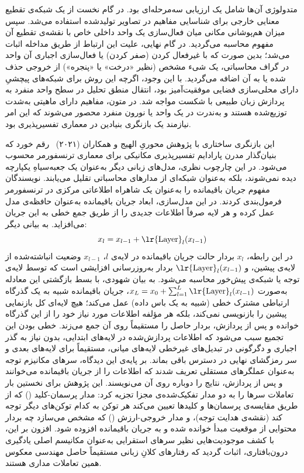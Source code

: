 متدولوژی آن‌ها شامل یک ارزیابی سه‌مرحله‌ای بود. در گام نخست از یک شبکه‌ی تقطیع معنایی خارجی برای شناسایی مفاهیم در تصاویر تولیدشده استفاده می‌شد. سپس میزان هم‌پوشانی مکانی میان فعال‌سازی یک واحد داخلی خاص با نقشه‌ی تقطیع آن مفهوم محاسبه می‌گردید. در گام نهایی، علیت این ارتباط از طریق مداخله اثبات می‌شد؛ بدین صورت که با غیرفعال کردن (صفر کردن) یا فعال‌سازی اجباری آن واحد در گراف محاسباتی، یک شیء مشخص (نظیر «درخت» یا «پنجره») از خروجی حذف شده یا به آن اضافه می‌گردید. با این وجود، اگرچه این روش برای شبکه‌های پیچشیِ دارای محلی‌سازی فضایی موفقیت‌آمیز بود، انتقال منطق تحلیل در سطح واحد منفرد به پردازش زبان طبیعی با شکست مواجه شد. در متون، مفاهیم دارای ماهیتی به‌شدت توزیع‌شده هستند و به‌ندرت در یک واحد یا نورون منفرد محصور می‌شوند که این امر نیازمند یک بازنگری بنیادین در معماری تفسیرپذیری بود.

این بازنگری ساختاری با پژوهش محوریِ الهیج و همکاران (۲۰۲۱)~\cite{elhage2021mathematical} رقم خورد که بنیان‌گذار مدرن پارادایم تفسیرپذیری مکانیکی برای معماری ترنسفورمر محسوب می‌شود. در این چارچوب نظری، مدل‌های زبانی دیگر به‌عنوان یک جعبه‌سیاهِ یکپارچه دیده نمی‌شوند، بلکه به‌عنوان شبکه‌ای از مدارهای محاسباتی تقلیل می‌یابند. نویسندگان مفهوم جریان باقیمانده را به‌عنوان یک شاهراه اطلاعاتی مرکزی در ترنسفورمر فرمول‌بندی کردند. در این مدل‌سازی، ابعاد جریان باقیمانده به‌عنوان حافظه‌ی مدل عمل کرده و هر لایه صرفاً اطلاعات جدیدی را از طریق جمع خطی به این جریان می‌افزاید. به بیانی دیگر:
\begin{equation}\label{eq:chap3_residual_stream}
    x_l = x_{l-1} + \text{\lr{Layer}}_l(x_{l-1})
\end{equation}
در این رابطه، $x_l$ بردار حالت جریان باقیمانده در لایه‌ی $l$، $x_{l-1}$ وضعیت انباشته‌شده از لایه‌ی پیشین، و $\text{\lr{Layer}}_l(x_{l-1})$ بردار به‌روزرسانی افزایشی است که توسط لایه‌ی توجه یا شبکه‌ی پیش‌خور محاسبه می‌شود. به بیان شهودی، با بسط بازگشتی این معادله به‌صورت $x_L = x_0 + \sum_{l=1}^L \text{\lr{Layer}}_l(x_{l-1})$، جریان باقیمانده شبیه به یک گذرگاه ارتباطی مشترک خطی (شبیه به یک باس داده) عمل می‌کند؛ هیچ لایه‌ای کل بازنمایی پیشین را بازنویسی نمی‌کند، بلکه هر مؤلفه اطلاعات مورد نیاز خود را از این گذرگاه خوانده و پس از پردازش، بردار حاصل را مستقیماً روی آن جمع می‌زند. خطی بودن این تجمیع سبب می‌شود که اطلاعات پردازش‌شده در لایه‌های ابتدایی، بدون نیاز به گذر اجباری و دگرگونی در تبدیل‌های غیرخطی لایه‌های میانی، مستقیماً برای لایه‌های بعدی و سر رمزگشای نهایی در دسترس باقی بماند. بر پایه‌ی این دیدگاه، سرهای مکانیزم توجه به‌عنوان عملگرهای مستقلی تعریف شدند که اطلاعات را از جریان باقیمانده می‌خوانند و پس از پردازش، نتایج را دوباره روی آن می‌نویسند. این پژوهش برای نخستین بار تعاملات سرها را به دو مدار تفکیک‌شده‌ی مجزا تجزیه کرد: مدار پرسمان-کلید () که از طریق مقایسه‌ی پرسمان‌ها و کلیدها تعیین می‌کند هر توکن به کدام توکن‌های دیگر توجه کند (نقشه‌ی هدایت توجه)، و مدار خروجی-ارزش () که مشخص می‌سازد چه بردار محتوایی از موقعیت مبدأ خوانده شده و به جریان باقیمانده افزوده شود. افزون بر این، با کشف موجودیت‌هایی نظیر سرهای استقرایی به‌عنوان مکانیسم اصلی یادگیری درون‌بافتاری، اثبات گردید که رفتارهای کلانِ زبانی مستقیماً حاصل مهندسی معکوس همین تعاملات مداری هستند.

